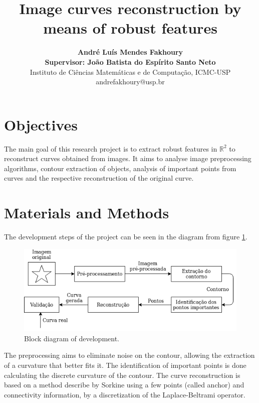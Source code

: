 \documentclass[a4paper,10pt,twocolumn]{article}
\begin{document}
	\title{\large{\vspace{-1cm}\textbf{Image curves reconstruction by means of robust features}}}
	\author{\textbf{André Luís Mendes Fakhoury}\vspace{0.2cm}\\
		\textbf{Supervisor: João Batista do Espírito Santo Neto}\vspace{0.2cm}\\
		Instituto de Ciências Matemáticas e de Computação, ICMC-USP\\
		\normalsize{andrefakhoury@usp.br \quad }}
	
	\date{\null}
	\maketitle
	
	\thispagestyle{fancy}
	
	\section*{\hfil Objectives}
	
	The main goal of this research project is to extract robust features in $\mathbb{R}^2$ to reconstruct curves obtained from images. It aims to analyse image preprocessing algorithms, contour extraction of objects, analysis of important points from curves and the respective reconstruction of the original curve.
	
	\section*{\hfil Materials and Methods}
	The development steps of the project can be seen in the diagram from figure \ref{fig:diagrama}.
	\begin{figure}[ht!]
	\centering
	\includegraphics[width=0.9\linewidth]{imagens/diagrama.png}
	\caption{Block diagram of development.}
	\label{fig:diagrama}
	\end{figure}
	The preprocessing aims to eliminate noise on the contour, allowing the extraction of a curvature that better fits it. The identification of important points is done calculating the discrete curvature of the contour. The curve reconstruction is based on a method describe by Sorkine \cite{sorkine} using a few points (called anchor) and connectivity information, by a discretization of the Laplace-Beltrami operator.
	
\end{document}
